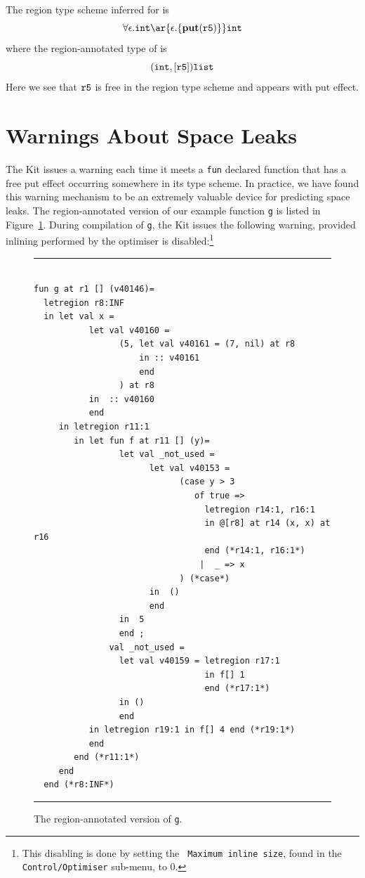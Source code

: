\documentclass[12pt]{book}
\begin{document}
The region type scheme inferred for  is
$$\forall\epsilon.\boxml{int} \ar{\epsilon.\{\Put(\mathtt{r5})\}} \boxml{int}$$
where the region-annotated type of  is
$$(\hbox{\tt int},[\hbox{\tt r5}])\hbox{\tt list}$$
Here we see that $\hbox{\tt r5}$ is free in the region type scheme and appears with put effect.

\section{Warnings About Space Leaks}
The Kit issues a warning each time it meets a {\tt fun} declared
function that has a free put effect occurring somewhere in its type
scheme. In practice, we have found this warning mechanism to be an
extremely valuable device for predicting space leaks. The region-annotated version of our example function {\tt g} is listed in
Figure~\ref{escape_mulexp.fig}. During compilation of {\tt g}, the Kit issues the
following warning, provided inlining performed by the optimiser is
disabled:\footnote{This disabling is done by setting the {\tt
    Maximum inline size}, found in the {\tt Control/Optimiser} sub-menu, to 0.}
\begin{figure}
\hrule
\begin{verbatim}

fun g at r1 [] (v40146)= 
  letregion r8:INF 
  in let val x = 
           let val v40160 = 
                 (5, let val v40161 = (7, nil) at r8 
                     in :: v40161 
                     end 
                 ) at r8
           in  :: v40160
           end 
     in letregion r11:1 
        in let fun f at r11 [] (y)= 
                 let val _not_used = 
                       let val v40153 = 
                             (case y > 3 
                                of true => 
                                  letregion r14:1, r16:1 
                                  in @[r8] at r14 (x, x) at r16 
                                  end (*r14:1, r16:1*)
                                 |  _ => x
                             ) (*case*) 
                       in  ()
                       end 
                 in  5
                 end ; 
               val _not_used = 
                 let val v40159 = letregion r17:1 
                                  in f[] 1 
                                  end (*r17:1*) 
                 in () 
                 end 
           in letregion r19:1 in f[] 4 end (*r19:1*)
           end  
        end (*r11:1*)
     end  
  end (*r8:INF*)
\end{verbatim}
\caption{The region-annotated version of {\tt g}.}
\medskip
\hrule
\label{escape_mulexp.fig}
\end{figure}
\end{document}
